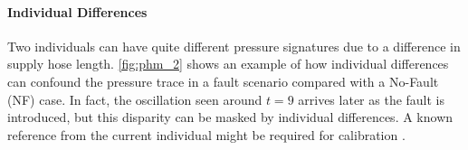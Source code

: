







\paragraph{Individual Differences}




Two individuals can have quite different pressure signatures due to a difference in supply hose length. \cref{fig:phm_2} shows an example of how individual differences can confound the pressure trace in a fault scenario compared with a No-Fault (NF) case. 
In fact, the oscillation seen around $t = 9$ arrives later as the fault is introduced, but this disparity can be masked by individual differences. A known reference from the current individual might be required for calibration \cite{jakobsson2022time}. %


